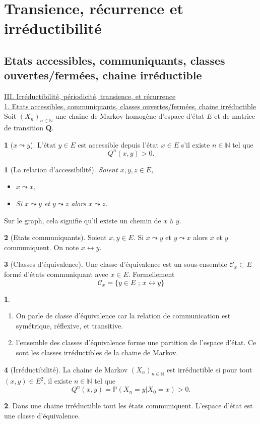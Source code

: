 \documentclass[8pt,notheorems]{beamer}
\def \N{\mathbb N}
\newtheorem{prop}{\translate{Proposition}}
\theoremstyle{definition}
\newtheorem{definition}{\translate{Definition}}
\theoremstyle{example}
\newtheorem{remark}{\translate{Remarque}}
\theoremstyle{mystyle}
\theoremstyle{plain}
\begin{document}
\section{Transience, récurrence et irréductibilité}
\subsection{Etats accessibles, communiquants, classes ouvertes/fermées, chaine irréductible}
\begin{frame}[allowframebreaks]
\underline{III. Irréductibilité, périodicité, transience, et récurrence}\\
\underline{1. Etats accessibles, communiquants, classes ouvertes/fermées, chaine irréductible}
Soit $(X_n)_{n\in\N}$ une chaine de Markov homogène d'espace d'état $E$ et de matrice de transition $\mathbf{Q}$.
\begin{definition}[$x\leadsto y$]
L'état $y\in E$ est accessible depuis l'état $x\in E$ s'il existe $n\in\N$ tel que
$$
Q^{n}(x,y)>0.
$$
\end{definition}
\begin{prop}[La relation d'accessibilité]
Soient $x,y,z\in E$,
\begin{itemize}
\item $x\leadsto x$,
\item Si $x\leadsto y$ et $y\leadsto z$ alors $x\leadsto z$.
\end{itemize}
\end{prop}
Sur le graph, cela signifie qu'il existe un chemin de $x$ à $y$.
\begin{definition}[Etats communiquants]
Soient $x,y\in E$. Si $x\leadsto y$ et $y\leadsto x$ alors $x$ et $y$ communiquent. On note $x\leftrightarrow y$.
\end{definition}
\end{frame}
\begin{frame}[allowframebreaks]
\begin{definition}[Classes d'équivalence]
Une classe d'équivalence est un sous-ensemble $\mathcal{C}_x\subset E$ formé d'états communiquant avec $x\in E$. Formellement
$$
\mathcal{C}_x=\{y\in E\text{ ; }x\leftrightarrow y\}
$$
\end{definition}
\begin{remark}
\begin{enumerate}
\item On parle de classe d'équivalence car la relation de communication est symétrique, réflexive, et transitive.
\item l'ensemble des classes d'équivalence forme une partition de l'espace d'état. Ce sont les classes irréductibles de la chaine de Markov.
\end{enumerate}
\end{remark}
\begin{definition}[Irréductibilité]
La chaine de Markov $(X_n)_{n\in\N}$ est irréductible si pour tout $(x,y)\in E^{2}$, il existe $n\in\N$ tel que
$$Q^{n}(x,y)=\mathbb{P}(X_n=y|X_0=x)>0.$$
\end{definition}
\begin{remark}
Dans une chaine irréductible tout les états communiquent. L'espace d'état est une classe d'équivalence.
\end{remark}
\end{frame}
\end{document}
